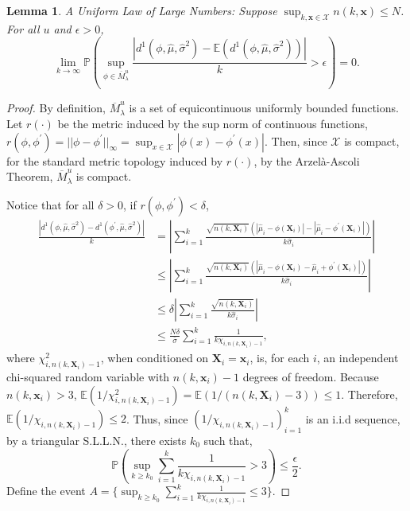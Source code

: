 \documentclass[12pt]{article}
\newcommand{\spa}[1]{\text{{$\mathcal{#1}$}}}
\newcommand{\des}{\ensuremath{\bm{x}}}
\newcommand{\vect}[1]{\ensuremath{\bm{#1}}}
\newcommand{\desCap}{\ensuremath{\bm{X}}}
\newtheorem{lemma}{Lemma}
\begin{document}
\begin{lemma}
\label{lemma: ulln}
 A Uniform Law of Large Numbers: Suppose $\sup_{k,\vect{x} \in \spa{X}} n(k,\vect{x}) \leq N$. For all $u$ and $\epsilon>0$,
 $$\lim_{k \to \infty}\mathbb{P}\left (\sup_{\phi \in \overline{M}^u_\lambda}\frac{|d^1(\phi,\hat{\mu},\hat{\sigma}^2)-\mathbb{E}\left ( d^1(\phi,\hat{\mu},\hat{\sigma}^2)\right )|}{k}>\epsilon\right )=0.$$
\end{lemma}
\begin{proof}
    By definition, $\overline{M}^u_\lambda$ is a set of equicontinuous uniformly bounded functions. Let $r(\cdot)$ be the metric induced by the sup norm of continuous functions, $r(\phi,\phi^\prime)=||\phi-\phi^\prime||_\infty=\sup_{x \in \spa{X}}|\phi(x)-\phi^\prime(x)|.$ Then, since $\spa{X}$ is compact, for the standard metric topology induced by $r(\cdot)$, by the Arzel\`a-Ascoli Theorem, $\overline{M}^u_\lambda$ is compact. 

    Notice that for all $\delta>0$, if $r(\phi,\phi^\prime)<\delta$, 
    \begin{equation*}
        \begin{split}
            \frac{\left |d^1(\phi,\hat{\mu},\hat{\sigma}^2)-d^1(\phi^\prime,\hat{\mu},\hat{\sigma}^2)\right |}{k}&=\left | \sum_{i=1}^k\frac{\sqrt{n(k,\desCap_i)}(|\hat{\mu}_i-\phi(\desCap_i)|-|\hat{\mu}_i-\phi^\prime(\desCap_i)|)}{k \hat{\sigma}_i} \right |\\
            & \leq \left | \sum_{i=1}^k\frac{\sqrt{n(k,\desCap_i)}(|\hat{\mu}_i-\phi(\desCap_i)-\hat{\mu}_i+\phi^\prime(\desCap_i)|)}{k \hat{\sigma}_i} \right |\\
            & \leq \delta \left | \sum_{i=1}^k\frac{\sqrt{n(k,\desCap_i)}}{k \hat{\sigma}_i} \right |\\
            & \leq \frac{N\delta}{\bar{\sigma}} \sum_{i=1}^k \frac{1}{k\chi_{i,n(k,\desCap_i)-1}},
        \end{split}
    \end{equation*}
    where $\chi_{i,n(k,\desCap_i)-1}^2$, when conditioned on $\desCap_i=\des_i$, is, for each $i$, an independent chi-squared random variable with $n(k,\des_i)-1$ degrees of freedom. Because $n(k,\des_i)>3$, $\mathbb{E}(1/\chi_{i,n(k,\desCap_i)-1}^2)=\mathbb{E}(1/(n(k,\desCap_i)-3))\leq 1$. Therefore, $\mathbb{E}(1/\chi_{i,n(k,\desCap_i)-1})\leq 2$. Thus, since $(1/\chi_{i,n(k,\desCap_i)-1})_{i=1}^k$ is an i.i.d sequence, by a triangular S.L.L.N., there exists $k_0$ such that,
    $$\mathbb{P}\left ( \sup_{k\geq k_0} \sum_{i=1}^k \frac{1}{k\chi_{i,n(k,\desCap_i)-1}} > 3\right )\leq \frac{\epsilon}{2}.$$
    Define the event $A=\{\sup_{k\geq k_0} \sum_{i=1}^k \frac{1}{k\chi_{i,n(k,\desCap_i)-1}} \leq 3\}$.
    

\end{proof}
\end{document}
